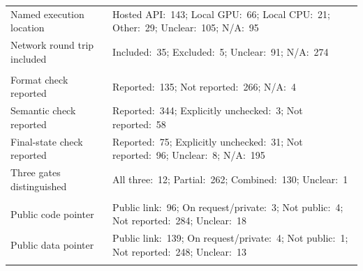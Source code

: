 \begin{table}[!htbp]
\begin{tabular}{>{\raggedright\arraybackslash}p{.27\sokcategorywidth}>{\raggedright\arraybackslash}p{.73\sokcategorywidth}}
Named execution location & Hosted API:~143; Local GPU:~66; Local CPU:~21; Other:~29; Unclear:~105; N/A:~95 \\
\addlinespace[3pt]
Network round trip included & Included:~35; Excluded:~5; Unclear:~91; N/A:~274 \\
\addlinespace[3pt]
\rowcolor{ebAmber!45}\multicolumn{2}{l}{\textbf{\itshape Validation responsibilities}} \\*
Format check reported & Reported:~135; Not reported:~266; N/A:~4 \\
\addlinespace[3pt]
Semantic check reported & Reported:~344; Explicitly unchecked:~3; Not reported:~58 \\
\addlinespace[3pt]
Final-state check reported & Reported:~75; Explicitly unchecked:~31; Not reported:~96; Unclear:~8; N/A:~195 \\
\addlinespace[3pt]
Three gates distinguished & All three:~12; Partial:~262; Combined:~130; Unclear:~1 \\
\addlinespace[3pt]
\rowcolor{ebAmber!45}\multicolumn{2}{l}{\textbf{\itshape Artifact pointers}} \\*
Public code pointer & Public link:~96; On request/private:~3; Not public:~4; Not reported:~284; Unclear:~18 \\
\addlinespace[3pt]
Public data pointer & Public link:~139; On request/private:~4; Not public:~1; Not reported:~248; Unclear:~13 \\
\addlinespace[3pt]
\bottomrule
\end{tabular}
\end{table}
